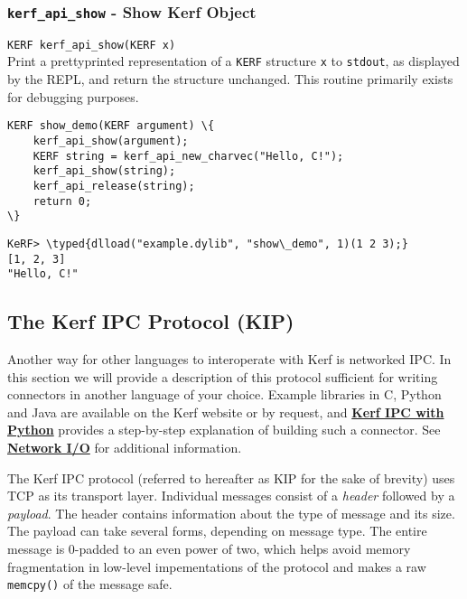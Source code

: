 \documentclass{article}
\newcommand{\typed}[1]{\textcolor{TealBlue}{#1}}
\newcommand{\ffidef}[3]{\subsubsection{\texttt{#1} - #2}\label{ffi:#3}}
\begin{document}
\ffidef{kerf\_api\_show}{Show Kerf Object}{kerfApiShow}
\texttt{KERF kerf\_api\_show(KERF x)}\\

Print a prettyprinted representation of a \texttt{KERF} structure \texttt{x} to \texttt{stdout}, as displayed by the REPL, and return the structure unchanged. This routine primarily exists for debugging purposes.

\begin{Verbatim}
KERF show_demo(KERF argument) \{
	kerf_api_show(argument);
	KERF string = kerf_api_new_charvec("Hello, C!");
	kerf_api_show(string);
	kerf_api_release(string);
	return 0;
\}
\end{Verbatim}
\begin{Verbatim}
KeRF> \typed{dlload("example.dylib", "show\_demo", 1)(1 2 3);}
[1, 2, 3]
"Hello, C!"
\end{Verbatim}


\vspace{0.5cm}

\pagebreak
\subsection{The Kerf IPC Protocol (KIP)}\label{sec:kipspec}

Another way for other languages to interoperate with Kerf is networked IPC. In this section we will provide a description of this protocol sufficient for writing connectors in another language of your choice. Example libraries in C, Python and Java are available on the Kerf website or by request, and \hyperref[sec:pythonkip]{\textbf{Kerf IPC with Python}} provides a step-by-step explanation of building such a connector. See \hyperref[sec:netio]{\textbf{Network I/O}} for additional information.

\vspace{0.5cm}

The Kerf IPC protocol (referred to hereafter as KIP for the sake of brevity) uses TCP as its transport layer. Individual messages consist of a \emph{header} followed by a \emph{payload}. The header contains information about the type of message and its size. The payload can take several forms, depending on message type. The entire message is 0-padded to an even power of two, which helps avoid memory fragmentation in low-level impementations of the protocol and makes a raw \texttt{memcpy()} of the message safe. 

\vspace{0.5cm}
\end{document}
